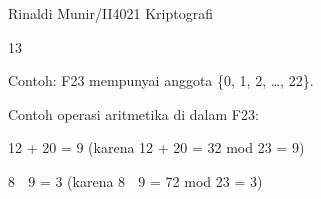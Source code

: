 \documentclass{article}
\begin{document}

Rinaldi Munir/II4021 Kriptografi

13

Contoh: F23 mempunyai anggota \{0, 1, 2, …, 22\}. 

      Contoh operasi aritmetika di dalam F23:


12 + 20 = 9 (karena 12 + 20 = 32 mod 23 = 9)


8  9 = 3       (karena 8  9 = 72 mod 23 = 3)
\end{document}
